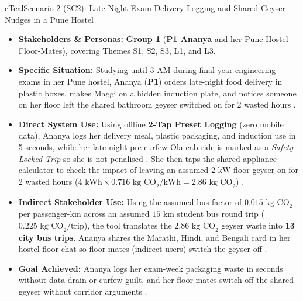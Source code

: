 \documentclass[12pt, a4paper]{article}
\begin{document}
\begin{scenariocard}{cTeal}{Scenario 2 (SC2): Late-Night Exam Delivery Logging and Shared Geyser Nudges in a Pune Hostel}
\begin{itemize}
    \item \textbf{Stakeholders \& Personas:} \textbf{Group 1} (\textbf{P1 Ananya} and her Pune Hostel Floor-Mates), covering Themes S1, S2, S3, L1, and L3.
    \item \textbf{Specific Situation:} Studying until 3 AM during final-year engineering exams in her Pune hostel, Ananya (\textbf{P1}) orders late-night food delivery in plastic boxes, makes Maggi on a hidden induction plate, and notices someone on her floor left the shared bathroom geyser switched on for 2 wasted hours \cite{cf1, cf7}.
    \item \textbf{Direct System Use:} Using offline \textbf{2-Tap Preset Logging} (zero mobile data), Ananya logs her delivery meal, plastic packaging, and induction use in 5 seconds, while her late-night pre-curfew Ola cab ride is marked as a \textit{Safety-Locked Trip} so she is not penalised \cite{cf1}. She then taps the shared-appliance calculator to check the impact of leaving an assumed $2\text{ kW}$ floor geyser on for 2 wasted hours ($4\text{ kWh} \times 0.716\text{ kg CO}_2/\text{kWh} = 2.86\text{ kg CO}_2$) \cite{cf1}.
    \item \textbf{Indirect Stakeholder Use:} Using the assumed bus factor of $0.015\text{ kg CO}_2$ per passenger-km across an assumed $15\text{ km}$ student bus round trip ($0.225\text{ kg CO}_2/\text{trip}$), the tool translates the $2.86\text{ kg CO}_2$ geyser waste into \textbf{13 city bus trips}. Ananya shares the Marathi, Hindi, and Bengali card in her hostel floor chat so floor-mates (indirect users) switch the geyser off \cite{cf1, cf7}.
    \item \textbf{Goal Achieved:} Ananya logs her exam-week packaging waste in seconds without data drain or curfew guilt, and her floor-mates switch off the shared geyser without corridor arguments \cite{cf1}.
\end{itemize}
\end{scenariocard}
\end{document}
